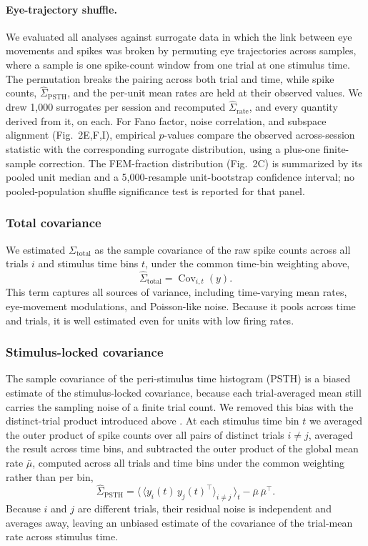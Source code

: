 \documentclass{lite}
\renewcommand{\C}{\operatorname{Cov}}
\newcommand{\Ctotal}{\Sigma_{\text{total}}}
\begin{document}
\paragraph{Eye-trajectory shuffle.} We evaluated all analyses against surrogate data in which the link between eye movements and spikes was broken by permuting eye trajectories across samples, where a sample is one spike-count window from one trial at one stimulus time. The permutation breaks the pairing across both trial and time, while spike counts, $\hat{\Sigma}_{\mathrm{PSTH}}$, and the per-unit mean rates are held at their observed values. We drew 1,000 surrogates per session and recomputed $\hat{\Sigma}_{\mathrm{rate}}$, and every quantity derived from it, on each. For Fano factor, noise correlation, and subspace alignment (Fig.~2E,F,I), empirical $p$-values compare the observed across-session statistic with the corresponding surrogate distribution, using a plus-one finite-sample correction. The FEM-fraction distribution (Fig.~2C) is summarized by its pooled unit median and a 5,000-resample unit-bootstrap confidence interval; no pooled-population shuffle significance test is reported for that panel.

\subsubsection{Total covariance}
We estimated $\Ctotal$ as the sample covariance of the raw spike counts across all trials $i$ and stimulus time bins $t$, under the common time-bin weighting above,
\begin{equation}
    \hat{\Sigma}_{\text{total}} = \C_{i,t}(y).
\end{equation}
This term captures all sources of variance, including time-varying mean rates, eye-movement modulations, and Poisson-like noise. Because it pools across time and trials, it is well estimated even for units with low firing rates.

\subsubsection{Stimulus-locked covariance}
The sample covariance of the peri-stimulus time histogram (PSTH) is a biased estimate of the stimulus-locked covariance, because each trial-averaged mean still carries the sampling noise of a finite trial count. We removed this bias with the distinct-trial product introduced above \cite{sahani2003linear}. At each stimulus time bin $t$ we averaged the outer product of spike counts over all pairs of distinct trials $i \neq j$, averaged the result across time bins, and subtracted the outer product of the global mean rate $\bar{\mu}$, computed across all trials and time bins under the common weighting rather than per bin,
\begin{equation}
    \hat{\Sigma}_{\text{PSTH}} = \big\langle\, \langle y_{i}(t)\, y_{j}(t)^\top \rangle_{i \neq j} \,\big\rangle_{t} - \bar{\mu}\,\bar{\mu}^\top.
\end{equation}
Because $i$ and $j$ are different trials, their residual noise is independent and averages away, leaving an unbiased estimate of the covariance of the trial-mean rate across stimulus time.
\end{document}
